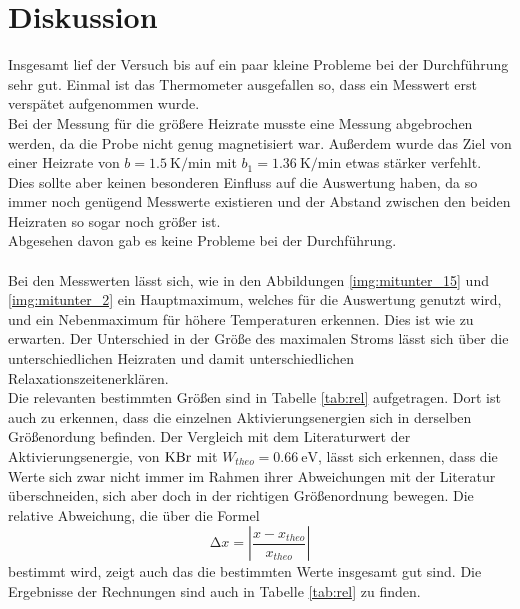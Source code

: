 \newpage
\section{Diskussion}

\noindent
Insgesamt lief der Versuch bis auf ein paar kleine Probleme bei der Durchführung sehr gut.
Einmal ist das Thermometer ausgefallen so, dass ein Messwert erst verspätet aufgenommen wurde.\\
Bei der Messung für die größere Heizrate musste eine Messung abgebrochen werden, da die Probe nicht genug magnetisiert war.
Außerdem wurde das Ziel von einer Heizrate von $b =\SI{1.5}{\kelvin\per\minute}$ mit $b_1 =\SI{1.36}{\kelvin\per\minute}$ etwas stärker verfehlt.
Dies sollte aber keinen besonderen Einfluss auf die Auswertung haben, da so immer noch genügend Messwerte existieren und der Abstand zwischen den beiden Heizraten so sogar noch größer ist.\\
Abgesehen davon gab es keine Probleme bei der Durchführung.\\\\

\noindent
Bei den Messwerten lässt sich, wie in den Abbildungen \ref{img:mitunter_15} und \ref{img:mitunter_2} ein Hauptmaximum, welches für die Auswertung genutzt wird, und ein Nebenmaximum für höhere Temperaturen erkennen.
Dies ist wie zu erwarten. Der Unterschied in der Größe des maximalen Stroms lässt sich über die unterschiedlichen Heizraten und damit unterschiedlichen Relaxationszeitenerklären.\\
Die relevanten bestimmten Größen sind in Tabelle \ref{tab:rel} aufgetragen. 
Dort ist auch zu erkennen, dass die einzelnen Aktivierungsenergien sich in derselben Größenordung befinden. 
Der Vergleich mit dem Literaturwert der Aktivierungsenergie, von $\ce{KBr}$ mit $W_{theo} = \SI{0.66}{\electronvolt}$\cite{lit}, 
lässt sich erkennen, dass die Werte sich zwar nicht immer im Rahmen ihrer Abweichungen mit der Literatur überschneiden, sich aber doch in der richtigen Größenordnung bewegen.
Die relative Abweichung, die über die Formel  
\begin{equation*}
    \increment x = \left| \frac{x - x_{theo}}{x_{theo}} \right|
\end{equation*}
bestimmt wird, zeigt auch das die bestimmten Werte insgesamt gut sind. Die Ergebnisse der Rechnungen sind auch in Tabelle \ref{tab:rel} zu finden.

